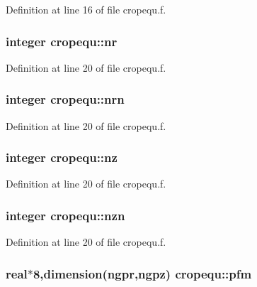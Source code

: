 Definition at line 16 of file cropequ.f.\hypertarget{namespacecropequ_27fba5a93cdc5a7654bdf5667c178b15}{
\subsubsection[nr]{\setlength{\rightskip}{0pt plus 5cm}integer {\bf cropequ::nr}}}
\label{namespacecropequ_27fba5a93cdc5a7654bdf5667c178b15}




Definition at line 20 of file cropequ.f.\hypertarget{namespacecropequ_8343e4bb7153d2e5b304f677249a514a}{
\subsubsection[nrn]{\setlength{\rightskip}{0pt plus 5cm}integer {\bf cropequ::nrn}}}
\label{namespacecropequ_8343e4bb7153d2e5b304f677249a514a}




Definition at line 20 of file cropequ.f.\hypertarget{namespacecropequ_ffd518930bd0631a6a50368c71e950b4}{
\subsubsection[nz]{\setlength{\rightskip}{0pt plus 5cm}integer {\bf cropequ::nz}}}
\label{namespacecropequ_ffd518930bd0631a6a50368c71e950b4}




Definition at line 20 of file cropequ.f.\hypertarget{namespacecropequ_d9c10ef53d2478403af28fcbabddebaa}{
\subsubsection[nzn]{\setlength{\rightskip}{0pt plus 5cm}integer {\bf cropequ::nzn}}}
\label{namespacecropequ_d9c10ef53d2478403af28fcbabddebaa}




Definition at line 20 of file cropequ.f.\hypertarget{namespacecropequ_5473fc74d051d894f0ec5d9f694b5a7c}{
\subsubsection[pfm]{\setlength{\rightskip}{0pt plus 5cm}real$\ast$8,dimension({\bf ngpr},{\bf ngpz}) {\bf cropequ::pfm}}}
\label{namespacecropequ_5473fc74d051d894f0ec5d9f694b5a7c}




